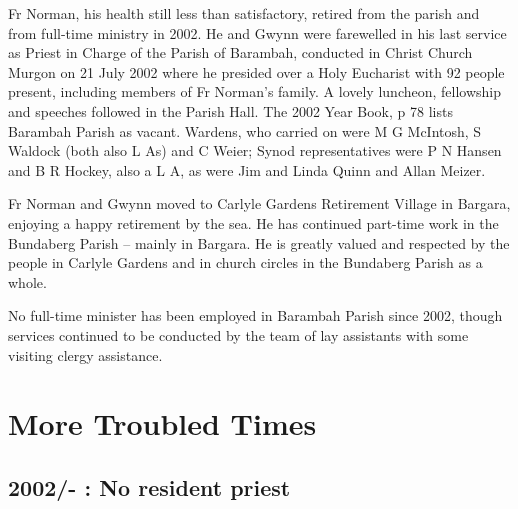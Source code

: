 Fr Norman, his health still less than satisfactory, retired from the parish and from full-time ministry in 2002. He and Gwynn were farewelled in his last service as Priest in Charge of the Parish of Barambah, conducted in Christ Church Murgon on 21 July 2002 where he presided over a Holy Eucharist with 92 people present, including members of Fr Norman's family. A lovely luncheon, fellowship and speeches followed in the Parish Hall. The 2002 Year Book, p 78 lists Barambah Parish as vacant. Wardens, who carried on were M G McIntosh, S Waldock (both also L As) and C Weier; Synod representatives were P N Hansen and B R Hockey, also a L A, as were Jim and Linda Quinn and Allan Meizer.



Fr Norman and Gwynn moved to Carlyle Gardens Retirement Village in Bargara, enjoying a happy retirement by the sea. He has continued part-time work in the Bundaberg Parish -- mainly in Bargara. He is greatly valued and respected by the people in Carlyle Gardens and in church circles in the Bundaberg Parish as a whole.



No full-time minister has been employed in Barambah Parish since 2002, though services continued to be conducted by the team of lay assistants with some visiting clergy assistance.



\balance


\printendnotes[custom]
\setcounter{endnote}{0}
\chapter{More Troubled Times}
\nobalance


\section{2002/- : No resident priest}



